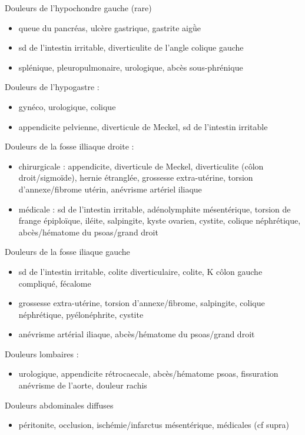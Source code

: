 \documentclass[11pt]{article}
\begin{document}
Douleurs de l'hypochondre gauche (rare)
\begin{itemize}
\item queue du pancréas, ulcère gastrique, gastrite aigǜe
\item sd de l'intestin irritable, diverticulite de l'angle colique gauche
\item splénique, pleuropulmonaire, urologique, abcès sous-phrénique
\end{itemize}

Douleurs de l'hypogastre :
\begin{itemize}
\item gynéco, urologique, colique
\item appendicite pelvienne, diverticule de Meckel, sd de l'intestin irritable
\end{itemize}

Douleurs de la fosse illiaque droite :
\begin{itemize}
\item chirurgicale : appendicite, diverticule de Meckel, diverticulite (côlon
droit/sigmoïde), hernie étranglée, grossesse extra-utérine, torsion
d'annexe/fibrome utérin, anévrisme artériel iliaque
\item médicale : sd de l'intestin irritable, adénolymphite mésentérique, torsion de
frange épiploïque, iléite, salpingite, kyste ovarien, cystite, colique
néphrétique, abcès/hématome du psoas/grand droit
\end{itemize}
Douleurs de la fosse iliaque gauche
\begin{itemize}
\item sd de l'intestin irritable, colite diverticulaire, colite, K côlon gauche
compliqué, fécalome
\item grossesse extra-utérine, torsion d'annexe/fibrome, salpingite, colique
néphrétique, pyélonéphrite, cystite
\item anévrisme artérial iliaque, abcès/hématome du psoas/grand droit
\end{itemize}
Douleurs lombaires : 
\begin{itemize}
\item urologique, appendicite rétrocaecale, abcès/hématome psoas, fissuration anévrisme de l'aorte, douleur rachis
\end{itemize}

Douleurs abdominales diffuses 
\begin{itemize}
\item péritonite, occlusion, ischémie/infarctus mésentérique, médicales (cf supra)
\end{itemize}
\end{document}
